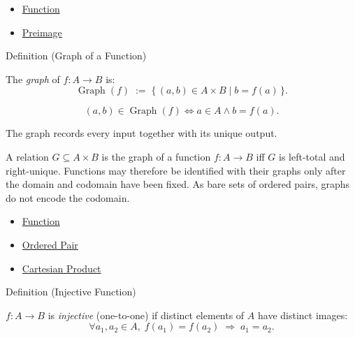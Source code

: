 \begin{dependencies}
\begin{itemize}
  \item \hyperref[def:function]{Function}
  \item \hyperref[def:preimage]{Preimage}
\end{itemize}
\end{dependencies}

\begin{definitionbox}{Definition (Graph of a Function)}
\begin{definition}\label{def:graph}
The \emph{graph} of $f : A \to B$ is:
\[
\operatorname{Graph}(f)
\;:=\;
\{\, (a,b) \in A \times B \mid b = f(a) \,\}.
\]
\end{definition}
\end{definitionbox}

\begin{remark*}
\[
  (a,b)\in\operatorname{Graph}(f)
  \iff
  a\in A\wedge b=f(a).
\]
\end{remark*}

\begin{remark*}[Interpretation]
The graph records every input together with its unique output.
\end{remark*}

\begin{remark*}[Exposition]
A relation $G \subseteq A \times B$ is the graph of a function $f : A \to B$
iff $G$ is left-total and right-unique. Functions may therefore be identified
with their graphs only after the domain and codomain have been fixed. As bare
sets of ordered pairs, graphs do not encode the codomain.
\end{remark*}

\begin{dependencies}
\begin{itemize}
  \item \hyperref[def:function]{Function}
  \item \hyperref[def:ordered-pair]{Ordered Pair}
  \item \hyperref[def:cartesian-product]{Cartesian Product}
\end{itemize}
\end{dependencies}

\begin{definitionbox}{Definition (Injective Function)}
\begin{definition}\label{def:injective}
$f : A \to B$ is \emph{injective} (one-to-one) if distinct elements of $A$
have distinct images:
\[
\forall a_1,a_2 \in A,\;
f(a_1)=f(a_2) \;\Longrightarrow\; a_1=a_2.
\]
\end{definition}
\end{definitionbox}


